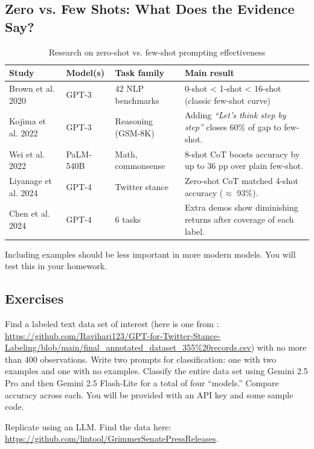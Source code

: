 \subsection{Zero vs. Few Shots: What Does the Evidence Say?}

\begin{table}[H]
\centering
\begin{tabular}{|l|l|l|l|}
\hline
\textbf{Study} & \textbf{Model(s)} & \textbf{Task family} & \textbf{Main result} \\
\hline
Brown et al. 2020 & GPT-3 & 42 NLP benchmarks & 0-shot < 1-shot < 16-shot (classic few-shot curve) \\
\hline
Kojima et al. 2022 & GPT-3 & Reasoning (GSM-8K) & Adding \textit{``Let's think step by step''} closes 60\% of gap to few-shot. \\
\hline
Wei et al. 2022 & PaLM-540B & Math, commonsense & 8-shot CoT boosts accuracy by up to 36 pp over plain few-shot. \\
\hline
Liyanage et al. 2024 & GPT-4 & Twitter stance & Zero-shot CoT matched 4-shot accuracy ($\approx$ 93\%). \\
\hline
Chen et al. 2024 & GPT-4 & 6 tasks & Extra demos show diminishing returns after coverage of each label. \\
\hline
\end{tabular}
\caption{Research on zero-shot vs. few-shot prompting effectiveness}
\end{table}

Including examples should be less important in more modern models. You will test this in your homework.

\subsection{Exercises}

\begin{tcolorbox}[breakable, size=fbox, boxrule=1pt, pad at break*=1mm,colback=cellbackground, colframe=cellborder, title=Exercise: LLM Classification Comparison]
Find a labeled text data set of interest (here is one from \cite{liyanage2024gpt}: \url{https://github.com/Ravihari123/GPT-for-Twitter-Stance-Labeling/blob/main/final_annotated_dataset_355\%20records.csv}) with no more than 400 observations. Write two prompts for classification: one with two examples and one with no examples. Classify the entire data set using Gemini 2.5 Pro and then Gemini 2.5 Flash-Lite for a total of four ``models.'' Compare accuracy across each. You will be provided with an API key and some sample code.
\end{tcolorbox}

\begin{tcolorbox}[breakable, size=fbox, boxrule=1pt, pad at break*=1mm,colback=cellbackground, colframe=cellborder, title=Exercise: Grimmer Replication]
Replicate \cite{grimmer2010bayesian} using an LLM. Find the data here: \url{https://github.com/lintool/GrimmerSenatePressReleases}.
\end{tcolorbox}